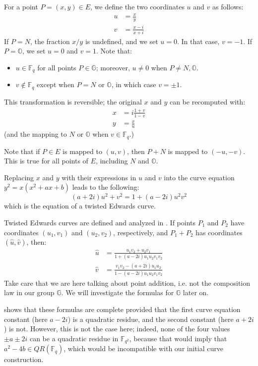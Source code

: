 \documentclass{llncs}
\newcommand{\QR}{QR}
\newcommand{\bF}{\mathbb{F}}
\newcommand{\bG}{\mathbb{G}}
\newcommand{\neutral}{\mathbb{O}}
\begin{document}
For a point $P = (x, y) \in E$, we define the two coordinates $u$
and $v$ as follows:
\begin{align*}
    u &= \frac{x}{y} \\
    v &= \frac{x-i}{x+i}
\end{align*}
If $P = N$, the fraction $x/y$ is undefined, and we set $u = 0$. In that
case, $v = -1$. If $P = \neutral$, we set $u = 0$ and $v = 1$. Note that:
\begin{itemize}
    \item $u \in \bF_q$ for all points $P \in \bG$; moreover, $u\neq 0$
    when $P \neq N, \neutral$.
    \item $v \notin \bF_q$ except when $P = N$ or $\neutral$, in which case
    $v = \pm 1$.
\end{itemize}
This transformation is reversible; the original $x$ and $y$ can be
recomputed with:
\begin{align*}
    x &= i \frac{1+v}{1-v} \\
    y &= \frac{x}{u}
\end{align*}
(and the mapping to $N$ or $\neutral$ when $v \in \bF_q$.)

Note that if $P \in E$ is mapped to $(u, v)$, then $P+N$ is mapped
to $(-u, -v)$. This is true for all points of $E$, including $N$ and
$\neutral$.

Replacing $x$ and $y$ with their expressions in $u$ and $v$ into the
curve equation $y^2 = x(x^2 + ax + b)$ leads to the following:
\begin{equation*}
    (a + 2i)u^2 + v^2 = 1 + (a - 2i)u^2 v^2
\end{equation*}
which is the equation of a twisted Edwards curve.

Twisted Edwards curves are defined and analyzed in
\cite{BerBirJoyLanPet2008}. If points $P_1$ and $P_2$ have coordinates
$(u_1, v_1)$ and $(u_2, v_2)$, respectively, and $P_1 + P_2$ has
coordinates $(\hat u, \hat v)$, then:
\begin{align*}
    \hat u &= \frac{u_1 v_2 + u_2 v_1}{1 + (a - 2i) u_1 u_2 v_1 v_2} \\
    \hat v &= \frac{v_1 v_2 - (a + 2i) u_1 u_2}{1 - (a - 2i) u_1 u_2 v_1 v_2}
\end{align*}
Take care that we are here talking about point addition, i.e. not the
composition law in our group $\bG$. We will investigate the formulas
for $\bG$ later on.

\cite{BerBirJoyLanPet2008} shows that these formulas are complete
provided that the first curve equation constant (here $a - 2i$) is a
quadratic residue, and the second constant (here $a + 2i$) is not.
However, this is not the case here; indeed, none of the four values $\pm
a\pm 2i$ can be a quadratic residue in $\bF_{q^2}$, because that would
imply that $a^2 - 4b \in \QR(\bF_q)$, which would be incompatible with
our initial curve construction.
\end{document}
